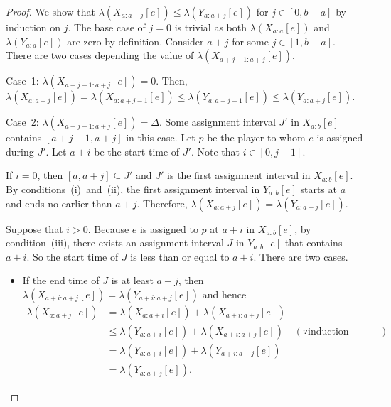 \documentclass[11pt,a4paper]{article}
\renewcommand{\leq}{\leqslant}
\begin{document}
\begin{proof}
	We show that $\lambda(X_{a:a+j}[e]) \leq \lambda(Y_{a:a+j}[e])$ for $j \in [0,b-a]$ by induction on $j$.  The base case of $j = 0$ is trivial as both $\lambda(X_{a:a}[e])$ and $\lambda(Y_{a:a}[e])$ are zero by definition.  Consider $a+j$ for some $j \in [1,b-a]$.  There are two cases depending the value of $\lambda(X_{a+j-1:a+j}[e])$.
	
	Case~1: $\lambda(X_{a+j-1:a+j}[e]) = 0$.  Then, $\lambda(X_{a:a+j}[e]) = \lambda(X_{a:a+j-1}[e]) \leq \lambda(Y_{a:a+j-1}[e]) \leq \lambda(Y_{a:a+j}[e])$.  
	
	Case~2: $\lambda(X_{a+j-1:a+j}[e]) = \Delta$.  Some assignment interval $J'$ in $X_{a:b}[e]$ contains $[a+j-1,a+j]$ in this case.  Let $p$ be the player to whom $e$ is assigned during $J'$.  Let $a+i$ be the start time of $J'$.  Note that $i \in [0,j-1]$.
	
	If $i = 0$, then $[a,a+j] \subseteq J'$ and $J'$ is the first assignment interval in $X_{a:b}[e]$.  By conditions~(i)~and~(ii), the first assignment interval in $Y_{a:b}[e]$ starts at $a$ and ends no earlier than $a+j$.  Therefore, $\lambda(X_{a:a+j}[e]) = \lambda(Y_{a:a+j}[e])$.  
	
	Suppose that $i > 0$.  
	Because $e$ is assigned to $p$ at $a+i$ in $X_{a:b}[e]$, by condition~(iii), there exists an assignment interval $J$ in $Y_{a:b}[e]$ that contains $a+i$.  So the start time of $J$ is less than or equal to $a+i$.  There are two cases.
	\begin{itemize}
		\item If the end time of $J$ is at least $a+j$, then $\lambda(X_{a+i:a+j}[e]) = \lambda(Y_{a+i:a+j}[e])$ and hence
		\begin{align*}
			\lambda(X_{a:a+j}[e]) & = \lambda(X_{a:a+i}[e]) + \lambda(X_{a+i:a+j}[e]) \\
			& \leq  \lambda(Y_{a:a+i}[e]) + \lambda(X_{a+i:a+j}[e])  
			& (\because \text{induction assumption}) \\
			& =  \lambda(Y_{a:a+i}[e]) + \lambda(Y_{a+i:a+j}[e])  \\
			& = \lambda(Y_{a:a+j}[e]).
		\end{align*}
	

\end{itemize}
\end{proof}
\end{document}
